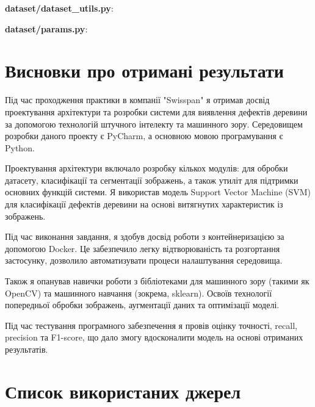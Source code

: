 \documentclass[oneside,14pt]{extarticle}
\begin{document}
\textbf{dataset/dataset\_utils.py}:
{\small}

\textbf{dataset/params.py}:
{\small}

\section*{Висновки про отримані результати}

Під час проходження практики в компанії "Swisspan" я отримав досвід проектування архітектури та розробки системи для виявлення дефектів деревини за допомогою технологій штучного інтелекту та машинного зору. Середовищем розробки даного проекту є PyCharm, а основною мовою програмування є Python.

Проектування архітектури включало розробку кількох модулів: для обробки датасету, класифікації та сегментації зображень, а також утиліт для підтримки основних функцій системи. Я використав модель Support Vector Machine (SVM) для класифікації дефектів деревини на основі витягнутих характеристик із зображень.

Під час виконання завдання, я здобув досвід роботи з контейнеризацією за допомогою Docker. Це забезпечило легку відтворюваність та розгортання застосунку, дозволило автоматизувати процеси налаштування середовища.

Також я опанував навички роботи з бібліотеками для машинного зору (такими як OpenCV) та машинного навчання (зокрема, sklearn). Освоїв технології попередньої обробки зображень, аугментації даних та оптимізації моделі.

Під час тестування програмного забезпечення я провів оцінку точності, recall, precision та F1-score, що дало змогу вдосконалити модель на основі отриманих результатів.

\section*{Список використаних джерел}
\end{document}
